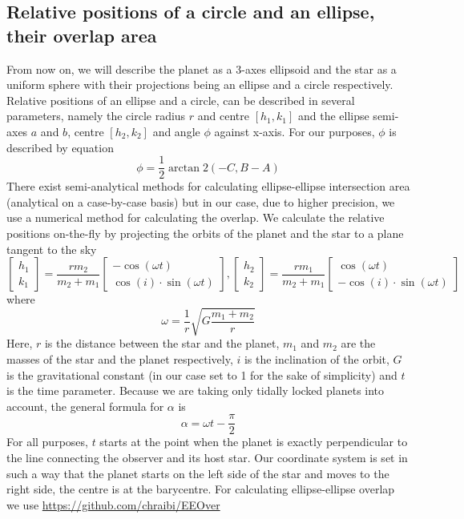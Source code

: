 \documentclass[10pt]{article}
\numberwithin{equation}{subsection}
\begin{document}
\subsection{Relative positions of a circle and an ellipse, their overlap area}
From now on, we will describe the planet as a 3-axes ellipsoid and the star as a uniform
sphere with their projections being an ellipse and a circle respectively.
Relative positions of an ellipse and a circle, can be described
in several parameters, namely the circle radius $r$ and centre $[h_1, k_1]$ and the
ellipse semi-axes $a$ and $b$, centre $[h_2, k_2]$ and angle $\phi$ against x-axis. For
our purposes, $\phi$ is described by equation \cite{walterova}
\begin{equation}
  \phi = \frac{1}{2}\arctan 2(-C, B-A)
  \label{eq:phi}
\end{equation}
There exist semi-analytical methods for calculating ellipse-ellipse intersection area
(analytical on a case-by-case basis) \cite{eeover} but in our case, due to higher
precision, we use a numerical method for calculating the overlap.
We calculate the relative positions on-the-fly by projecting the orbits of the planet
and the star to a plane tangent to the sky
\begin{equation}
  \begin{bmatrix}
    h_1 \\
    k_1 
  \end{bmatrix}
  = \frac{rm_2}{m_2+m_1}
  \begin{bmatrix}
    -\cos(\omega t) \\
    \cos(i)\cdot\sin(\omega t)
  \end{bmatrix},
  \begin{bmatrix}
    h_2 \\
    k_2 
  \end{bmatrix}
  = \frac{rm_1}{m_2+m_1}
  \begin{bmatrix}
    \cos(\omega t) \\
    -\cos(i)\cdot\sin(\omega t)
  \end{bmatrix}
  \label{eq:projected-orbit}
\end{equation}
where
\begin{equation}
  \omega = \frac{1}{r}\sqrt{G\frac{m_1 + m_2}{r}}
  \label{eq:omega}
\end{equation}
Here, $r$ is the distance between the star and the planet, $m_1$ and $m_2$ are the masses
of the star and the planet respectively, $i$ is the inclination of the orbit, $G$ is the
gravitational constant (in our case set to 1 for the sake of simplicity) and $t$ is the
time parameter. Because we are taking only tidally locked planets into account,
the general formula for $\alpha$ is
\begin{equation}
  \alpha = \omega t - \frac{\pi}{2}
  \label{eq:alpha_omega}
\end{equation}
For all purposes, $t$ starts at the point when the planet is exactly perpendicular to
the line connecting the observer and its host star. Our coordinate system is set in such
a way that the planet starts on the left side of the star and moves to the right side,
the centre is at the barycentre.
For calculating ellipse-ellipse overlap we use \url{https://github.com/chraibi/EEOver}
\end{document}
